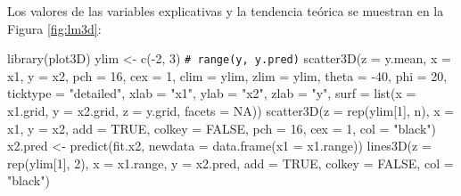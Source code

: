 \documentclass[
]{book}
\newenvironment{Shaded}{\begin{snugshade}}{\end{snugshade}}
\newcommand{\AttributeTok}[1]{\textcolor[rgb]{0.77,0.63,0.00}{#1}}
\newcommand{\CommentTok}[1]{\textcolor[rgb]{0.56,0.35,0.01}{\textit{#1}}}
\newcommand{\ConstantTok}[1]{\textcolor[rgb]{0.00,0.00,0.00}{#1}}
\newcommand{\DecValTok}[1]{\textcolor[rgb]{0.00,0.00,0.81}{#1}}
\newcommand{\FunctionTok}[1]{\textcolor[rgb]{0.00,0.00,0.00}{#1}}
\newcommand{\NormalTok}[1]{#1}
\newcommand{\OtherTok}[1]{\textcolor[rgb]{0.56,0.35,0.01}{#1}}
\newcommand{\SpecialCharTok}[1]{\textcolor[rgb]{0.00,0.00,0.00}{#1}}
\newcommand{\StringTok}[1]{\textcolor[rgb]{0.31,0.60,0.02}{#1}}
\theoremstyle{break}
\theoremstyle{nonumberplain}
\renewcommand{\CommentTok}[1]{\textcolor[rgb]{0.41,0.41,0.41}{\texttt{#1}}}
\begin{document}
Los valores de las variables explicativas y la tendencia teórica se muestran en la Figura \ref{fig:lm3d}:



\begin{Shaded}
\begin{Highlighting}[]
\FunctionTok{library}\NormalTok{(plot3D)}
\NormalTok{ylim }\OtherTok{\textless{}{-}} \FunctionTok{c}\NormalTok{(}\SpecialCharTok{{-}}\DecValTok{2}\NormalTok{, }\DecValTok{3}\NormalTok{) }\CommentTok{\# range(y, y.pred)}
\FunctionTok{scatter3D}\NormalTok{(}\AttributeTok{z =}\NormalTok{ y.mean, }\AttributeTok{x =}\NormalTok{ x1, }\AttributeTok{y =}\NormalTok{ x2, }\AttributeTok{pch =} \DecValTok{16}\NormalTok{, }\AttributeTok{cex =} \DecValTok{1}\NormalTok{, }\AttributeTok{clim =}\NormalTok{ ylim, }\AttributeTok{zlim =}\NormalTok{ ylim,}
          \AttributeTok{theta =} \SpecialCharTok{{-}}\DecValTok{40}\NormalTok{, }\AttributeTok{phi =} \DecValTok{20}\NormalTok{, }\AttributeTok{ticktype =} \StringTok{"detailed"}\NormalTok{, }
          \AttributeTok{xlab =} \StringTok{"x1"}\NormalTok{, }\AttributeTok{ylab =} \StringTok{"x2"}\NormalTok{, }\AttributeTok{zlab =} \StringTok{"y"}\NormalTok{, }
          \AttributeTok{surf =} \FunctionTok{list}\NormalTok{(}\AttributeTok{x =}\NormalTok{ x1.grid, }\AttributeTok{y =}\NormalTok{ x2.grid, }\AttributeTok{z =}\NormalTok{ y.grid, }\AttributeTok{facets =} \ConstantTok{NA}\NormalTok{))}
\FunctionTok{scatter3D}\NormalTok{(}\AttributeTok{z =} \FunctionTok{rep}\NormalTok{(ylim[}\DecValTok{1}\NormalTok{], n), }\AttributeTok{x =}\NormalTok{ x1, }\AttributeTok{y =}\NormalTok{ x2, }\AttributeTok{add =} \ConstantTok{TRUE}\NormalTok{, }\AttributeTok{colkey =} \ConstantTok{FALSE}\NormalTok{, }
           \AttributeTok{pch =} \DecValTok{16}\NormalTok{, }\AttributeTok{cex =} \DecValTok{1}\NormalTok{, }\AttributeTok{col =} \StringTok{"black"}\NormalTok{)}
\NormalTok{x2.pred }\OtherTok{\textless{}{-}} \FunctionTok{predict}\NormalTok{(fit.x2, }\AttributeTok{newdata =} \FunctionTok{data.frame}\NormalTok{(}\AttributeTok{x1 =}\NormalTok{ x1.range))}
\FunctionTok{lines3D}\NormalTok{(}\AttributeTok{z =} \FunctionTok{rep}\NormalTok{(ylim[}\DecValTok{1}\NormalTok{], }\DecValTok{2}\NormalTok{), }\AttributeTok{x =}\NormalTok{ x1.range, }\AttributeTok{y =}\NormalTok{ x2.pred, }\AttributeTok{add =} \ConstantTok{TRUE}\NormalTok{, }
        \AttributeTok{colkey =} \ConstantTok{FALSE}\NormalTok{, }\AttributeTok{col =} \StringTok{"black"}\NormalTok{) }
\end{Highlighting}
\end{Shaded}
\end{document}
